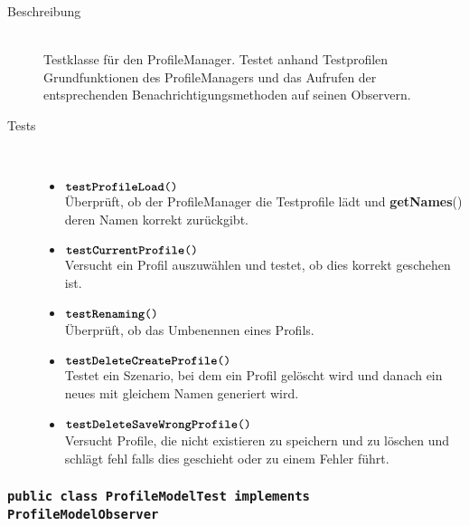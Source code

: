 \begin{description}
\item[Beschreibung] \hfill \\ Testklasse für den ProfileManager. Testet anhand Testprofilen Grundfunktionen des ProfileManagers und das Aufrufen der entsprechenden Benachrichtigungsmethoden auf seinen Observern.

\item[Tests] \hfill \\
	\vspace{-.8cm}
	\begin{itemize}
		\item $\texttt{\textbf{testProfileLoad}()}$ \\ Überprüft, ob der ProfileManager die Testprofile lädt und \textbf{getNames}() deren Namen korrekt zurückgibt.
		\item $\texttt{\textbf{testCurrentProfile}()}$ \\ Versucht ein Profil auszuwählen und testet, ob dies korrekt geschehen ist.
		\item $\texttt{\textbf{testRenaming}()}$ \\ Überprüft, ob das Umbenennen eines Profils.
		\item $\texttt{\textbf{testDeleteCreateProfile}()}$ \\ Testet ein Szenario, bei dem ein Profil gelöscht wird und danach ein neues mit gleichem Namen generiert wird.
		\item $\texttt{\textbf{testDeleteSaveWrongProfile}()}$ \\ Versucht Profile, die nicht existieren zu speichern und zu löschen und schlägt fehl falls dies geschieht oder zu einem Fehler führt.
	\end{itemize}
\end{description}

\subsubsection{\normalfont \texttt{public class \textbf{ProfileModelTest} implements ProfileModelObserver}}

